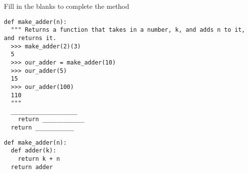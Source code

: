 \begin{blocksection}
\question Fill in the blanks to complete the method

\begin{lstlisting}
def make_adder(n):
  """ Returns a function that takes in a number, k, and adds n to it, and returns it.
  >>> make_adder(2)(3)
  5
  >>> our_adder = make_adder(10)
  >>> our_adder(5)
  15
  >>> our_adder(100)
  110
  """
  ___________________
    return ____________
  return ___________
\end{lstlisting}

\begin{solution}
\begin{lstlisting}
def make_adder(n):
  def adder(k):
    return k + n
  return adder
\end{lstlisting}
\end{solution}
\end{blocksection}